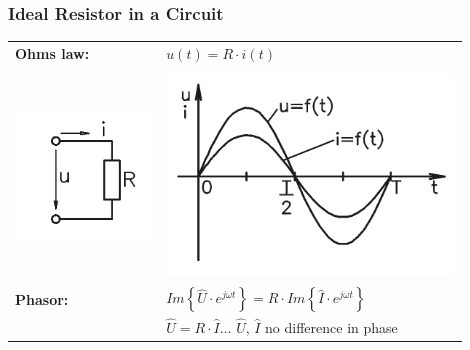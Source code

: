 \documentclass{beamer}
\begin{document}
	\begin{frame}
    \frametitle{Ideal Resistor in a Circuit}
		\begin{center}
		\begin{tabular}{m{0.3\linewidth} m{0.6\linewidth}}
			\textbf{Ohms law:} 					& $u\left(t\right)= R\cdot i\left(t\right)$\\\\
			\includegraphics[scale=0.4]{obr03_obvodRez.png}	& \includegraphics[scale=0.5]{obr04_obvodRezGraf.png}\\
			\textbf{Phasor:}						& $Im\left\{\hat{U}\cdot e^{j\omega t}\right\} = R\cdot Im\left\{\hat{I}\cdot e^{j\omega t}\right\} $\\
																	& $\hat{U} = R\cdot \hat{I}$... $\hat{U}$, $\hat{I}$ no difference in phase
		\end{tabular}
		\end{center}
  \end{frame}
	
\end{document}
